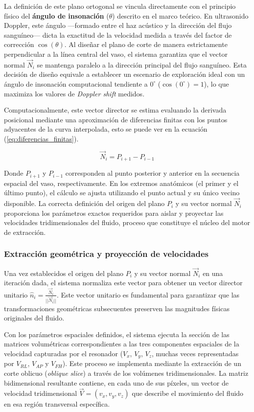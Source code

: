 La definición de este plano ortogonal se vincula directamente con el principio físico del \textbf{ángulo de insonación} ($\theta$) descrito en el marco teórico. En ultrasonido Doppler, este ángulo —formado entre el haz acústico y la dirección del flujo sanguíneo— dicta la exactitud de la velocidad medida a través del factor de corrección $\cos(\theta)$. Al diseñar el plano de corte de manera estrictamente perpendicular a la línea central del vaso, el sistema garantiza que el vector normal $\vec{N}_i$ se mantenga paralelo a la dirección principal del flujo sanguíneo. Esta decisión de diseño equivale a establecer un escenario de exploración ideal con un ángulo de insonación computacional tendiente a $0^\circ$ ($\cos(0^\circ) = 1$), lo que maximiza los valores de \textit{Doppler shift} medidos.

Computacionalmente, este vector director se estima evaluando la derivada posicional mediante una aproximación de diferencias finitas con los puntos adyacentes de la curva interpolada, esto se puede ver en la ecuación (\ref{eq:diferencias_finitas}).

\begin{equation}
    \vec{N}_i = P_{i+1} - P_{i-1}
    \label{eq:diferencias_finitas}
\end{equation}

Donde $P_{i+1}$ y $P_{i-1}$ corresponden al punto posterior y anterior en la secuencia espacial del vaso, respectivamente. En los extremos anatómicos (el primer y el último punto), el cálculo se ajusta utilizando el punto actual y su único vecino disponible. La correcta definición del origen del plano $P_i$ y su vector normal $\vec{N}_i$ proporciona los parámetros exactos requeridos para aislar y proyectar las velocidades tridimensionales del fluido, proceso que constituye el núcleo del motor de extracción.


\subsubsection{Extracción geométrica y proyección de velocidades}

Una vez establecidos el origen del plano $P_i$ y su vector normal $\vec{N}_i$ en una iteración dada, el sistema normaliza este vector para obtener un vector director unitario $\hat{n}_i = \frac{\vec{N}_i}{||\vec{N}_i||}$. Este vector unitario es fundamental para garantizar que las transformaciones geométricas subsecuentes preserven las magnitudes físicas originales del fluido.

Con los parámetros espaciales definidos, el sistema ejecuta la sección de las matrices volumétricas correspondientes a las tres componentes espaciales de la velocidad capturadas por el resonador ($V_x$, $V_y$, $V_z$, muchas veces representadas por $V_{RL}$, $V_{AP}$ y $V_{FH}$). Este proceso se implementa mediante la extracción de un corte oblicuo (\textit{oblique slice}) a través de los volúmenes tridimensionales. La matriz bidimensional resultante contiene, en cada uno de sus píxeles, un vector de velocidad tridimensional $\vec{V} = (v_x, v_y, v_z)$ que describe el movimiento del fluido en esa región transversal específica.

